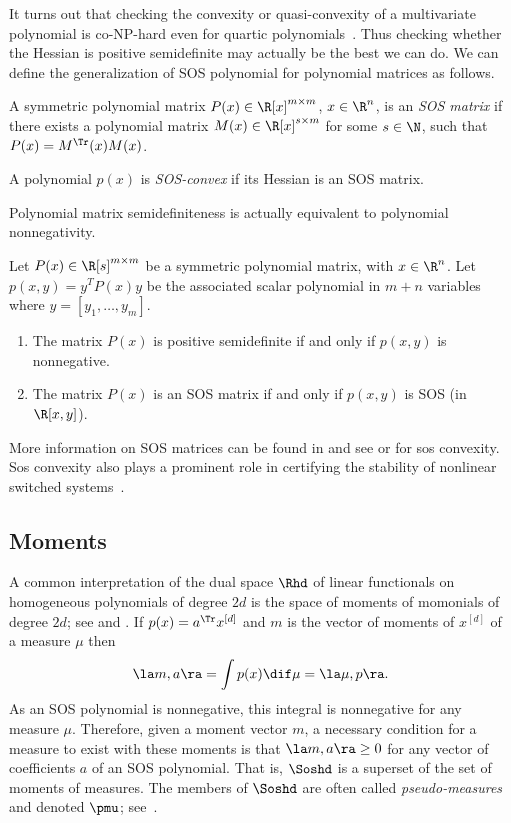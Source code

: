 \documentclass[11pt,twoside,a4paper,openright]{uclouvain-thesis}
\begin{document}
It turns out that checking the convexity or quasi-convexity of a multivariate polynomial is co-NP-hard even for quartic polynomials~\cite{ahmadi2013np}.
Thus checking whether the Hessian is positive semidefinite may actually be the best we can do.
We can define the generalization of SOS polynomial for polynomial matrices as follows.

\begin{mydef}
  A symmetric polynomial matrix $P(x) \in \R[x]^{m \times m}$, $x \in \R^n$, is an \emph{SOS matrix} if there exists a polynomial matrix $M(x) \in \R[x]^{s \times m}$ for some $s \in \N$,
  such that $P(x) = M^\Tr(x)M(x)$.

  A polynomial $p(x)$ is \emph{SOS-convex} if its Hessian is an SOS matrix.
\end{mydef}

Polynomial matrix semidefiniteness is actually equivalent to polynomial nonnegativity.

\begin{mylem}
  Let $P(x) \in \R[s]^{m \times m}$ be a symmetric polynomial matrix,
  with $x \in \R^n$.
  Let $p(x,y) = y^T P(x) y$ be the associated scalar polynomial in $m+n$ variables where $y = [y_1, \ldots, y_m]$.
  \begin{enumerate}
    \item The matrix $P(x)$ is positive semidefinite if and only if $p(x,y)$ is nonnegative.
    \item The matrix $P(x)$ is an SOS matrix if and only if $p(x,y)$ is SOS (in $\R[x,y]$).
  \end{enumerate}
\end{mylem}

More information on SOS matrices can be found in \cite[Section~3.3.2]{blekherman2012semidefinite} and see \cite[Section~3.3.3]{blekherman2012semidefinite} or \cite{ahmadi2012convex,ahmadi2013complete} for sos convexity.
Sos convexity also plays a prominent role in certifying the stability of nonlinear switched systems~\cite{ahmadi2013switched,ahmadi2013sos}.

\subsection{Moments}
\label{sec:moments}

A common interpretation of the dual space $\Rhd$ of linear functionals on homogeneous polynomials of degree $2d$ is the space of moments of momonials of degree $2d$; see \cite[Section~3.5]{blekherman2012semidefinite} and \cite{Lasserre2009}.
If $p(x) = a^\Tr x^{[d]}$ and $m$ is the vector of moments of $x^{[d]}$ of a measure $\mu$ then
\[ \la m, a \ra = \int p(x) \dif \mu = \la \mu, p \ra. \]
As an SOS polynomial is nonnegative,
this integral is nonnegative for any measure $\mu$.
Therefore, given a moment vector $m$, a necessary condition for a measure to exist with these moments is that $\la m, a \ra \geq 0$ for any vector of coefficients $a$ of an SOS polynomial.
That is, $\Soshd$ is a superset of the set of moments of measures.
The members of $\Soshd$ are often called \emph{pseudo-measures} and denoted $\pmu$; see~\cite{barak2012hypercontractivity}.
\end{document}
